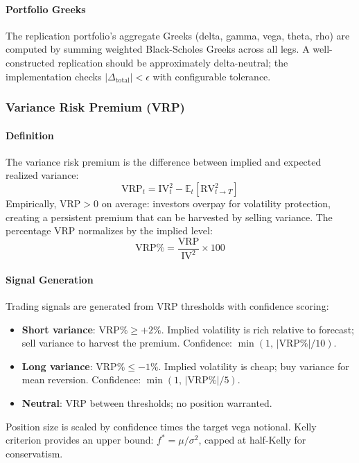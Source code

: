 \paragraph{Portfolio Greeks}

The replication portfolio's aggregate Greeks (delta, gamma, vega, theta, rho) are computed by summing weighted Black-Scholes Greeks across all legs. A well-constructed replication should be approximately delta-neutral; the implementation checks $|\Delta_{\text{total}}| < \epsilon$ with configurable tolerance.

\subsubsection{Variance Risk Premium (VRP)}

\paragraph{Definition}

The variance risk premium is the difference between implied and expected realized variance:
\[
\text{VRP}_t = \text{IV}_t^2 - \mathbb{E}_t [ \text{RV}_{t \to T}^2 ]
\]
Empirically, $\text{VRP} > 0$ on average: investors overpay for volatility protection, creating a persistent premium that can be harvested by selling variance. The percentage VRP normalizes by the implied level:
\[
\text{VRP}\% = \frac{\text{VRP}}{\text{IV}^2} \times 100
\]

\paragraph{Signal Generation}

Trading signals are generated from VRP thresholds with confidence scoring:
\begin{itemize}
  \item \textbf{Short variance}: $\text{VRP}\% \geq +2\%$. Implied volatility is rich relative to forecast; sell variance to harvest the premium. Confidence: $\min(1, \, |\text{VRP}\%| / 10)$.
  \item \textbf{Long variance}: $\text{VRP}\% \leq -1\%$. Implied volatility is cheap; buy variance for mean reversion. Confidence: $\min(1, \, |\text{VRP}\%| / 5)$.
  \item \textbf{Neutral}: VRP between thresholds; no position warranted.
\end{itemize}
Position size is scaled by confidence times the target vega notional. Kelly criterion provides an upper bound: $f^* = \mu / \sigma^2$, capped at half-Kelly for conservatism.

